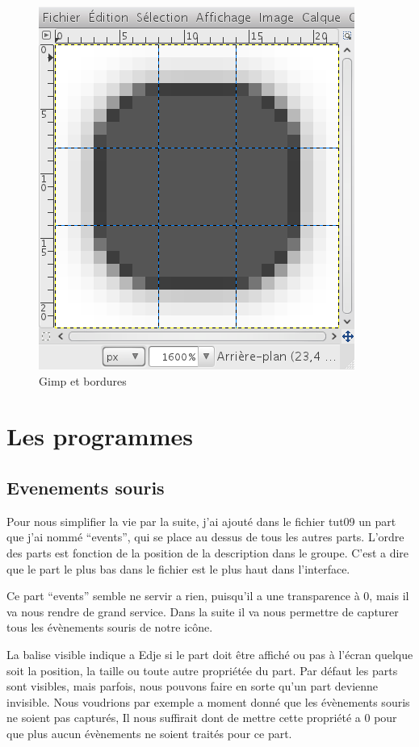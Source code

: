 \documentclass[a4paper]{efr}
\begin{document}
\begin{figure}
  \begin{center}
    \includegraphics[scale=0.5]{images/border2.png}
  \end{center}
  \caption{Gimp et bordures}
\end{figure}



\section{Les programmes}

\subsection{Evenements souris}

Pour nous simplifier la vie par la suite, j'ai ajouté dans le fichier tut09
un part que j'ai nommé ``events'', qui se place au dessus de tous les autres
parts. L'ordre des parts est fonction de la position de la description dans le
groupe. C'est a dire que le part le plus bas dans le fichier est le plus haut
dans l'interface.

Ce part ``events'' semble ne servir a rien, puisqu'il a une transparence à 0,
mais il va nous rendre de grand service. Dans la suite il va nous permettre de
capturer tous les évènements souris de notre icône.

La balise visible indique a Edje si le part doit être affiché ou pas à l'écran
quelque soit la position, la taille ou toute autre propriétée du part.
Par défaut les parts sont visibles, mais parfois, nous pouvons faire en sorte
qu'un part devienne invisible. Nous voudrions par exemple a moment donné que
les évènements souris ne soient pas capturés, Il nous suffirait dont de mettre
cette propriété a 0 pour que plus aucun évènements ne soient traités pour ce
part.
\end{document}
